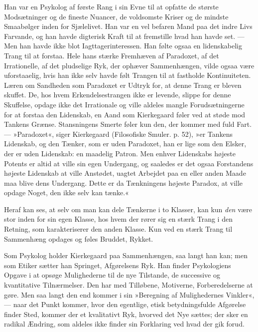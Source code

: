 \documentclass[12pt,a4paper,openany]{book}
\newcommand{\opage}[1]{\marginnote{\footnotesize\textit{[#1]}}}
\begin{document}
Han var en Psykolog af første Rang i sin Evne til
at opfatte de største Modsætninger og de fineste Nuancer,
de voldsomste Kriser og de mindste Smaabølger inden
for Sjælelivet. Han var en vel befaren Mand paa det
indre Livs Farvande, og han havde digterisk Kraft til
at fremstille hvad han havde set. --- Men han havde ikke
blot Iagttagerinteressen. Han følte ogsaa en lidenskabelig
Trang til at forstaa. Hele hans stærke Fremhæven af
Paradoxet, af det Irrationelle, af det pludselige Ryk, der
ophæver Sammenhængen, vilde ogsaa være uforstaaelig,
hvis han ikke selv havde følt Trangen til at fastholde Kontinuiteten.
Læren om Sandheden som Paradoxet er Udtryk
for, at denne Trang er bleven skuffet. De, hos
hvem Erkendelsestrangen ikke er levende, slippe for
denne Skuffelse, opdage ikke det Irrationale og ville aldeles
mangle Forudsætningerne for at forstaa den Lidenskab,
en Aand som Kierkegaard føler ved at støde mod
\opage{74}Tankens Grænse. Stansningens Smerte føler kun den,
der kommer med fuld Fart. --- »Paradoxet«, siger Kierkegaard
(Filosofiske Smuler. p. 52), »er Tankens Lidenskab,
og den Tænker, som er uden Paradoxet, han er
lige som den Elsker, der er uden Lidenskab: en maadelig
Patron. Men enhver Lidenskabs højeste Potents er
altid at ville sin egen Undergang, og saaledes er det ogsaa
Forstandens højeste Lidenskab at ville Anstødet,
uagtet Arbejdet paa en eller anden Maade maa blive
dens Undergang. Dette er da Tænkningens højeste
Paradox, at ville opdage Noget, den ikke selv kan
tænke.«

Heraf kan ses, at selv om man kan dele Tænkerne
i to Klasser, kan kun \textit{den} være stor inden for sin egen
Klasse, hos hvem der rører sig en stærk Trang i den
Retning, som karakteriserer den anden Klasse. Kun ved
en stærk Trang til Sammenhæng opdages og føles Bruddet,
Rykket.

Som Psykolog holder Kierkegaard paa Sammenhængen,
saa langt han kan; men som Etiker sætter han
Springet, Afgørelsens Ryk. Han finder Psykologiens
Opgave i at opsøge Mulighederne til de nye Tilstande,
de successive og kvantitative Tilnærmelser. Den har med
Tilløbene, Motiverne, Forberedelserne at gøre. Men saa
langt den end kommer i sin »Beregning af Mulighedernes
Vinkler«, --- naar det Punkt kommer, hvor den egentlige,
etisk betydningsfulde Afgørelse finder Sted, kommer der
et kvalitativt Ryk, hvorved det Nye sættes; der sker
en radikal Ændring, som aldeles ikke finder sin Forklaring
ved hvad der gik forud.
\end{document}
